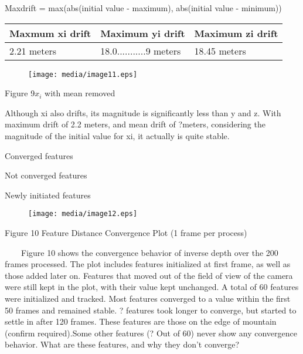 
Maxdrift = max(abs(initial value - maximum), abs(initial value - 
minimum)) 

\begin{table}[h]
\centering
\begin{tabular}{|l|l|l|}
\hline
Maxmum xi drift & Maximum yi drift & Maximum zi drift \\
\hline
2.21 meters & 18.0...........9 meters & 18.45 meters \\
\hline
\end{tabular}
\end{table}


\begin{figure}[h]
\centering
\texttt{[image: media/image11.eps]}
\end{figure}


\begin{center}Figure 9$x_{i}$ with mean removed\end{center}

Although xi also drifts, its magnitude is significantly less than y and 
z. With maximum drift of 2.2 meters, and mean drift of ?meters, 
considering the magnitude of the initial value for xi, it actually is 
quite stable. 

Converged features

Not converged features

Newly initiated features

\begin{figure}[h]
\centering
\texttt{[image: media/image12.eps]}
\end{figure}


\begin{center}Figure 10 Feature Distance Convergence Plot (1 frame per 
process)\end{center}

\ \ \ \ Figure 10 shows the convergence behavior of inverse depth over 
the 200 frames processed. The plot includes features initialized at 
first frame, as well as those added later on. Features that moved out of 
the field of view of the camera were still kept in the plot, with their 
value kept unchanged. A total of 60 features were initialized and 
tracked. Most features converged to a value within the first 50 frames 
and remained stable. ? features took longer to converge, but started to 
settle in after 120 frames. These features are those on the edge of 
mountain (confirm required).Some other features (? Out of 60) never show 
any convergence behavior. What are these features, and why they don't 
converge?


